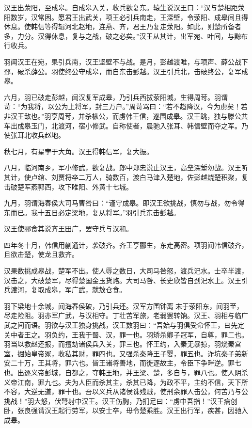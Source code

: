 \documentclass[12pt,UTF8]{ctexbook}
\begin{document}
汉王出荥阳，至成皋。自成皋入关，收兵欲复东。辕生说汉王曰：“汉与楚相距荥阳数岁，汉常困。愿君王出武关，项王必引兵南走，王深壁，令荥阳、成皋间且得休息。使韩信等得辑河北赵地，连燕、齐，君王乃复走荥阳。如此，则楚所备者多，力分。汉得休息，复与之战，破之必矣。”汉王从其计，出军宛、叶间，与黥布行收兵。



羽闻汉王在宛，果引兵南，汉王坚壁不与战。是月，彭越渡睢，与项声、薛公战下邳，破杀薛公。羽使终公守成皋，而自东击彭越。汉王引兵北，击破终公，复军成皋。



六月，羽已破走彭越，闻汉复军成皋，乃引兵西拔荥阳城，生得周苛。羽谓苛：“为我将，以公为上将军，封三万户。”周苛骂曰：“若不趋降汉，今为虏矣！若非汉王敌也。”羽亨周苛，并杀枞公，而虏韩王信，遂围成皋。汉王跳，独与滕公共车出成皋玉门，北渡河，宿小修武。自称使者，晨驰入张耳、韩信壁而夺之军。乃使张耳北收兵赵地。



秋七月，有星孛于大角。汉王得韩信军，复大振。



八月，临河南乡，军小修武，欲复战。郎中郑忠说止汉王，高垒深堑勿战。汉王听其计，使卢绾、刘贾将卒二万人，骑数百，渡白马津入楚地，佐彭越烧楚积聚，复击破楚军燕郭西，攻下睢阳、外黄十七城。



九月，羽谓海春侯大司马曹咎曰：“谨守成皋。即汉王欲挑战，慎勿与战，勿令得东而已。我十五日必定梁地，复从将军。”羽引兵东击彭越。



汉王使郦食其说齐王田广，罢守兵与汉和。



四年冬十月，韩信用蒯通计，袭破齐。齐王亨郦生，东走高密。项羽闻韩信破齐，且欲击楚，使龙且救齐。



汉果数挑成皋战，楚军不出。使人辱之数日，大司马咎怒，渡兵汜水。士卒半渡，汉击之，大破楚军，尽得楚国金玉货赂。大司马咎、长史欣皆自刭汜水上。汉王引兵渡河，复取成皋，军广武，就敖仓食。



羽下梁地十余城，闻海春侯破，乃引兵还。汉军方围钟离末于荥阳东，闻羽至，尽走险阻。羽亦军广武，与汉相守。丁壮苦军旅，老弱罢转饷。汉王、羽相与临广武之间而语。羽欲与汉王独身挑战，汉王数羽曰：“吾始与羽俱受命怀王，曰先定关中者王之。羽负约，王我于蜀、汉，罪一也。羽矫杀卿子冠军，自尊，罪二也。羽当以救赵还报，而擅劫诸侯兵入关，罪三也。怀王约，入秦无暴掠，羽烧秦宫室，掘始皇帝冢，收私其财，罪四也。又强杀秦降王子婴，罪五也。诈坑秦子弟新安二十万，王其将，罪六也。皆王诸将善地，而徙逐故主，令臣下争畔逆。罪七也。出逐义帝彭城，自都之，夺韩王地，并王梁、楚，多自与，罪八也。使人阴杀义帝江南，罪九也。夫为人臣而杀其主，杀其已降，为政不平，主约不信，天下所不容，大逆无道，罪十也。吾以义兵从诸侯诛残贼，使刑余罪人击公，何苦乃与公挑战！”羽大怒，伏弩射中汉王。汉王伤胸，乃扪足曰：“虏中吾指！”汉王病创卧，张良强请汉王起行劳军，以安士卒，毋令楚乘胜。汉王出行军，疾甚，因驰入成皋。
\end{document}

